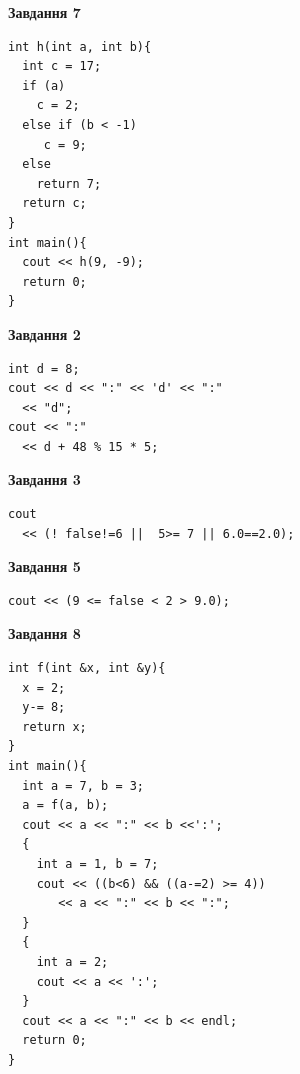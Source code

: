 \documentclass[12pt, ukrainian]{article}
\begin{document}
{\begin {large}
\begin{minipage}[t]{7.0cm}
\begin{center}
\textbf{Завдання 7}
\end{center}
\vspace{-8mm}

\begin{verbatim}
int h(int a, int b){
  int c = 17;
  if (a)
    c = 2;
  else if (b < -1)
     c = 9;
  else
    return 7;
  return c;
}
int main(){
  cout << h(9, -9);
  return 0;
}
\end{verbatim}

\end{minipage}
\vline \hspace{1mm}
\begin{minipage}[t]{11.0cm}

\begin{center}
\textbf{Завдання 2}
\end{center}
\vspace{-8mm}

\begin{verbatim}
int d = 8;
cout << d << ":" << 'd' << ":" 
  << "d";
cout << ":" 
  << d + 48 % 15 * 5;
\end{verbatim}



\begin{center}
\textbf{Завдання 3}
\end{center}
\vspace{-8mm}

\begin{verbatim}
cout 
  << (! false!=6 ||  5>= 7 || 6.0==2.0);
\end{verbatim}



\begin{center}
\textbf{Завдання 5}
\end{center}
\vspace{-8mm}

\begin{verbatim}
cout << (9 <= false < 2 > 9.0);
\end{verbatim}



\begin{center}
\textbf{Завдання 8}
\end{center}
\vspace{-8mm}

\begin{verbatim}
int f(int &x, int &y){
  x = 2;
  y-= 8;
  return x;
}
int main(){
  int a = 7, b = 3;
  a = f(a, b);
  cout << a << ":" << b <<':';
  {
    int a = 1, b = 7;
    cout << ((b<6) && ((a-=2) >= 4))
       << a << ":" << b << ":";
  }
  {
    int a = 2;
    cout << a << ':';
  }
  cout << a << ":" << b << endl;
  return 0;
}
\end{verbatim}


\end{minipage}
\end{large}}
\end{document}
